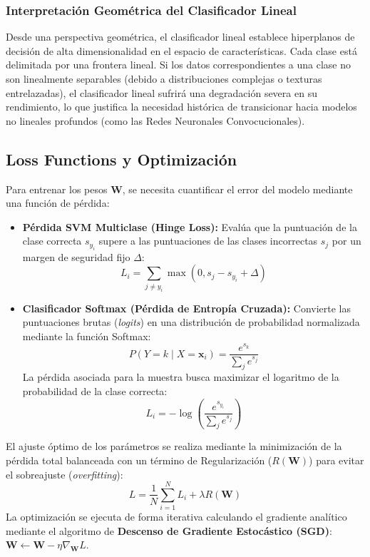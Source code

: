 \subsubsection{Interpretación Geométrica del Clasificador Lineal}
\noindent
Desde una perspectiva geométrica, el clasificador lineal establece hiperplanos de decisión de alta dimensionalidad en el espacio de características. Cada clase está delimitada por una frontera lineal. Si los datos correspondientes a una clase no son linealmente separables (debido a distribuciones complejas o texturas entrelazadas), el clasificador lineal sufrirá una degradación severa en su rendimiento, lo que justifica la necesidad histórica de transicionar hacia modelos no lineales profundos (como las Redes Neuronales Convocucionales).

\subsection{Loss Functions y Optimización}
\noindent
Para entrenar los pesos $\mathbf{W}$, se necesita cuantificar el error del modelo mediante una función de pérdida:

\begin{itemize}
    \item \textbf{Pérdida SVM Multiclase (Hinge Loss):} Evalúa que la puntuación de la clase correcta $s_{y_i}$ supere a las puntuaciones de las clases incorrectas $s_j$ por un margen de seguridad fijo $\Delta$:
    \begin{equation}
        L_i = \sum_{j \neq y_i} \max(0, s_j - s_{y_i} + \Delta)
    \end{equation}
    
    \item \textbf{Clasificador Softmax (Pérdida de Entropía Cruzada):} Convierte las puntuaciones brutas (\textit{logits}) en una distribución de probabilidad normalizada mediante la función Softmax:
    \begin{equation}
        P(Y = k \mid X = \mathbf{x}_i) = \frac{e^{s_{k}}}{\sum_{j} e^{s_j}}
    \end{equation}
    La pérdida asociada para la muestra busca maximizar el logaritmo de la probabilidad de la clase correcta:
    \begin{equation}
        L_i = -\log \left( \frac{e^{s_{y_i}}}{\sum_{j} e^{s_j}} \right)
    \end{equation}
\end{itemize}
\noindent
El ajuste óptimo de los parámetros se realiza mediante la minimización de la pérdida total balanceada con un término de Regularización ($R(\mathbf{W})$) para evitar el sobreajuste (\textit{overfitting}):
\begin{equation}
    L = \frac{1}{N} \sum_{i=1}^{N} L_i + \lambda R(\mathbf{W})
\end{equation}
La optimización se ejecuta de forma iterativa calculando el gradiente analítico mediante el algoritmo de \textbf{Descenso de Gradiente Estocástico (SGD)}: $\mathbf{W} \leftarrow \mathbf{W} - \eta \nabla_{\mathbf{W}}L$.


